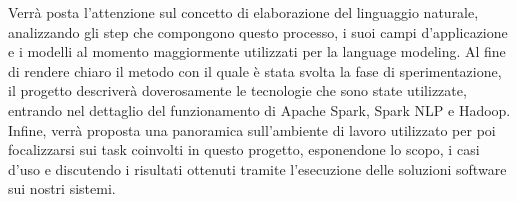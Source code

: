 Verrà posta l'attenzione sul concetto di elaborazione del linguaggio naturale, analizzando gli step che compongono questo processo, i suoi campi d'applicazione e i modelli al momento maggiormente utilizzati per la language modeling.
Al fine di rendere chiaro il metodo con il quale è stata svolta la fase di sperimentazione, il progetto descriverà doverosamente le tecnologie che sono state utilizzate, entrando nel dettaglio del funzionamento di Apache Spark, Spark NLP e Hadoop. Infine, verrà proposta una panoramica sull'ambiente di lavoro utilizzato per poi focalizzarsi sui task coinvolti in questo progetto, esponendone lo scopo, i casi d'uso e discutendo i risultati ottenuti tramite l'esecuzione delle soluzioni software sui nostri sistemi.